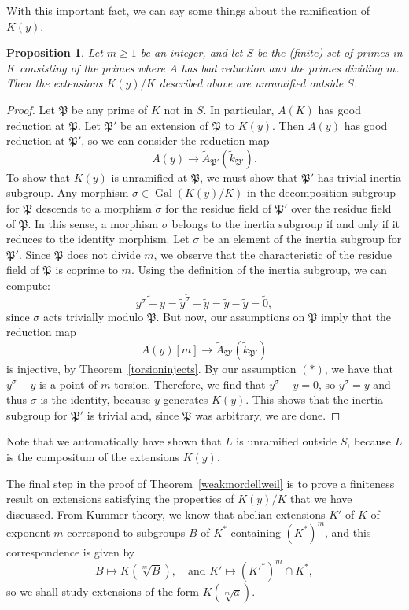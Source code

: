 \documentclass[a4paper, 12pt]{amsart}
\theoremstyle{definition}
\theoremstyle{plain}
\newtheorem{prop0}[defn0]{Proposition}
\theoremstyle{plain}
\theoremstyle{plain}
\theoremstyle{plain}
\theoremstyle{remark}
\theoremstyle{remark}
\theoremstyle{plain}
\newenvironment{proposition}{ \begin{prop0}}{\end{prop0}}
\newcommand{\thmref}[1]{Theorem~\ref{#1}}
\renewcommand{\P}{\mathfrak{P}}
\DeclareMathOperator{\Gal}{Gal}
\begin{document}
	With this important fact, we can say some things about the ramification of $K(y)$.
	\begin{proposition}\label{ramifS}
		Let $m\ge 1$ be an integer, and let $S$ be the (finite) set of primes in $K$ consisting of the primes where $A$ has bad reduction and the primes dividing $m$. Then the extensions $K(y)/K$ described above are unramified outside $S$.
	\end{proposition}
	\begin{proof}
		Let $\P$ be any prime of $K$ not in $S$. In particular, $A(K)$ has good reduction at $\P$. Let $\P'$ be an extension of $\P$ to $K(y)$. Then $A(y)$ has good reduction at $\P'$, so we can consider the reduction map
		\begin{equation*}
			A(y)\rightarrow \tilde{A}_{\P'}(\tilde{k}_{\P'}).
		\end{equation*}
		To show that $K(y)$ is unramified at $\P$, we must show that $\P'$ has trivial inertia subgroup. Any morphism $\sigma\in\Gal(K(y)/K)$ in the decomposition subgroup for $\P$ descends to a morphism $\tilde{\sigma}$ for the residue field of $\P'$ over the residue field of $\P$. In this sense, a morphism $\sigma$ belongs to the inertia subgroup if and only if it reduces to the identity morphism. Let $\sigma$ be an element of the inertia subgroup for $\P'$. Since $\P$ does not divide $m$, we observe that the characteristic of the residue field of $\P$ is coprime to $m$. Using the definition of the inertia subgroup, we can compute:
		\begin{equation*}
			\widetilde{y^\sigma-y}=\tilde{y}^{\tilde{\sigma}}-\tilde{y}=\tilde{y}-\tilde{y}=\tilde{0},
		\end{equation*}
		since $\sigma$ acts trivially modulo $\P$. But now, our assumptions on $\P$ imply that the reduction map
		\begin{equation*}
			A(y)[m]\rightarrow \tilde{A}_{\P'}(\tilde{k}_{\P'})
		\end{equation*}
		is injective, by \thmref{torsioninjects}. By our assumption $(*)$, we have that $y^\sigma-y$ is a point of $m$-torsion. Therefore, we find that $y^\sigma-y=0$, so $y^\sigma=y$ and thus $\sigma$ is the identity, because $y$ generates $K(y)$. This shows that the inertia subgroup for $\P'$ is trivial and, since $\P$ was arbitrary, we are done.
	\end{proof}
	Note that we automatically have shown that $L$ is unramified outside $S$, because $L$ is the compositum of the extensions $K(y)$.
	
	The final step in the proof of \thmref{weakmordellweil} is to prove a finiteness result on extensions satisfying the properties of $K(y)/K$ that we have discussed. From Kummer theory, we know that abelian extensions $K'$ of $K$ of exponent $m$ correspond to subgroups $B$ of $K^*$ containing $(K^*)^m$, and this correspondence is given by
	\begin{equation}\label{correspondence}
		B\mapsto K(\sqrt[m]{B}),\quad\text{and } K'\mapsto (K'^*)^m\cap K^*,
	\end{equation}
	so we shall study extensions of the form $K(\sqrt[m]{a})$.
	
\end{document}
